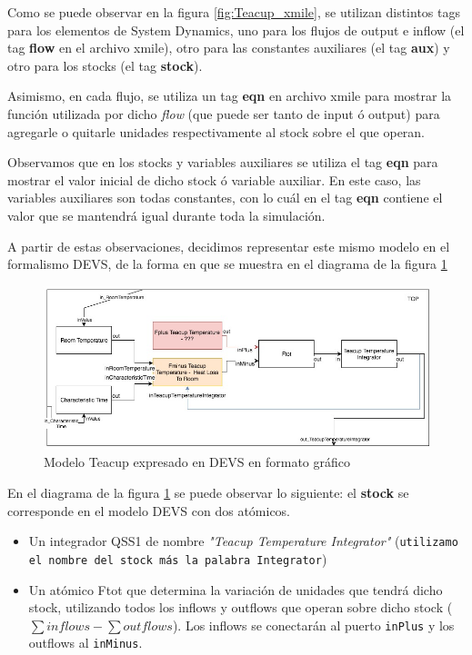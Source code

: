 Como se puede observar en la figura \ref{fig:Teacup_xmile}, se utilizan distintos tags para los elementos de System Dynamics, uno para los flujos de output e inflow (el tag \textbf{flow} en el archivo xmile), otro para las constantes auxiliares (el tag \textbf{aux}) y otro para los stocks (el tag \textbf{stock}). 

Asimismo, en cada flujo, se utiliza un tag \textbf{eqn} en archivo xmile para mostrar la función utilizada por dicho \textit{flow} (que puede ser tanto de input ó output) para agregarle o quitarle unidades respectivamente al stock sobre el que operan. 

Observamos que en los stocks y variables auxiliares se utiliza el tag \textbf{eqn} para mostrar el valor inicial de dicho stock ó variable auxiliar. En este caso, las variables auxiliares son todas constantes, con lo cuál en el tag \textbf{eqn} contiene el valor que se mantendrá igual durante toda la simulación.

A partir de estas observaciones, decidimos representar este mismo modelo en el formalismo DEVS, de la forma en que se muestra en el diagrama de la figura \ref{fig:Teacup_devs_flattened}

\begin{figure}[!h]
\centering
\includegraphics[scale=0.5]{imagenes/Teacup_devs_flattened}
\caption{Modelo Teacup expresado en DEVS en formato gráfico}
\label{fig:Teacup_devs_flattened}
\end{figure}

En el diagrama de la figura \ref{fig:Teacup_devs_flattened} se puede observar lo siguiente: el \textbf{stock} se corresponde en el modelo DEVS con dos atómicos.

\begin{itemize}
	\item Un integrador QSS1 de nombre \textit{"Teacup Temperature Integrator"} (\texttt{utilizamo el nombre del stock más la palabra Integrator})
	\item Un atómico Ftot que determina la variación de unidades que tendrá dicho stock, utilizando todos los inflows y outflows que operan sobre dicho stock ($\sum inflows - \sum outflows $). Los inflows se conectarán al puerto \texttt{inPlus} y los outflows al \texttt{inMinus}. 
\end{itemize}

